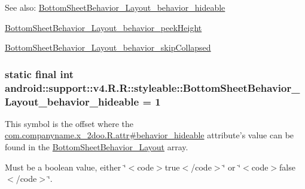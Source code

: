 \begin{Desc}
\item[See also:]\hyperlink{classandroid_1_1support_1_1v4_1_1_r_1_1styleable_aa3e1df0519e9c584de90cb3311b3ab9}{BottomSheetBehavior\_\-Layout\_\-behavior\_\-hideable} 

\hyperlink{classandroid_1_1support_1_1v4_1_1_r_1_1styleable_c5dfbc2d674faeb8b8e9c8aca7bace87}{BottomSheetBehavior\_\-Layout\_\-behavior\_\-peekHeight} 

\hyperlink{classandroid_1_1support_1_1v4_1_1_r_1_1styleable_5f8ab199874fa9fe7918ba54df0f40cc}{BottomSheetBehavior\_\-Layout\_\-behavior\_\-skipCollapsed} \end{Desc}
\hypertarget{classandroid_1_1support_1_1v4_1_1_r_1_1styleable_aa3e1df0519e9c584de90cb3311b3ab9}{
\subsubsection[{BottomSheetBehavior\_\-Layout\_\-behavior\_\-hideable}]{\setlength{\rightskip}{0pt plus 5cm}static final int android::support::v4.R.R::styleable::BottomSheetBehavior\_\-Layout\_\-behavior\_\-hideable = 1}}
\label{classandroid_1_1support_1_1v4_1_1_r_1_1styleable_aa3e1df0519e9c584de90cb3311b3ab9}


This symbol is the offset where the \hyperlink{classcom_1_1companyname_1_1x__2doo_1_1_r_1_1attr_684fba60aba8261fc57b84ed51f99343}{com.companyname.x\_\-2doo.R.attr\#behavior\_\-hideable} attribute's value can be found in the \hyperlink{classandroid_1_1support_1_1v4_1_1_r_1_1styleable_d67360f84d04f5db038977a30714370e}{BottomSheetBehavior\_\-Layout} array.

Must be a boolean value, either \char`\"{}$<$code$>$true$<$/code$>$\char`\"{} or \char`\"{}$<$code$>$false$<$/code$>$\char`\"{}. 


